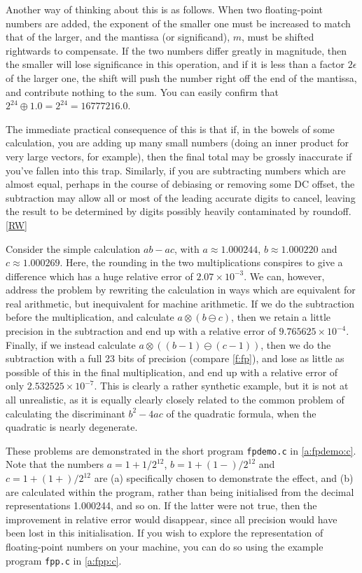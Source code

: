 \documentclass[11pt,oneside,chapters]{starlink}
\begin{document}
Another way of thinking about this is as follows.  When
two floating-point numbers are added, the exponent of
the smaller one must be increased to match that of the
larger, and the mantissa (or significand),
$m$, must be shifted rightwards
to compensate.  If the two numbers differ greatly in
magnitude, then the smaller will lose significance in
this operation, and if it is less than a factor
$2\epsilon$ of the larger one,
the shift will push the number right off the end of the
mantissa, and contribute nothing to the sum.  You can
easily confirm that $2^{24}\oplus1.0=2^{24}=16777216.0$.

The immediate practical consequence of this is that if,
in the bowels of some calculation, you are adding up
many small numbers (doing an inner product for very
large vectors, for example), then the final total may be
grossly inaccurate if you've fallen into this trap.
Similarly, if you are subtracting numbers which are
almost equal, perhaps in the course of debiasing or
removing some DC offset, the subtraction may allow all
or most of the leading accurate digits to cancel,
leaving the result to be determined by digits possibly
heavily contaminated by roundoff.  [\hyperlink{ta:rw}{RW}]

Consider the simple
calculation $ab-ac$, with
$a\approx1.000244$,
$b\approx1.000220$ and
$c\approx1.000269$.  Here, the
rounding in the two multiplications conspires to give a
difference which has a huge relative error of
$2.07\times10^{-3}$.  We can,
however, address the problem by rewriting the
calculation in ways which are equivalent for real
arithmetic, but inequivalent for machine arithmetic.  If
we do the subtraction before the multiplication, and
calculate $a\otimes(b\ominus c)$,
then we retain a little precision in the
subtraction and end up with a relative error of
$9.765625\times10^{-4}$.
Finally, if we instead calculate
$a\otimes((b-1)\ominus(c-1))$,
then we do the subtraction with a full 23 bits of
precision (compare \ref{f:fp}), and lose as little
as possible of this in the final multiplication, and end
up with a relative error of only
$2.532525\times10^{-7}$.  This
is clearly a rather synthetic example, but it is not at
all unrealistic, as it is equally clearly closely
related to the common problem of calculating the
discriminant $b^2-4ac$ of the
quadratic formula, when the quadratic is nearly
degenerate.

These problems are demonstrated in
the short program \texttt{fpdemo.c} in
\ref{a:fpdemo:c}.  Note that the numbers
$a=1+1/2^{12}$,
$b=1+(1-)/2^{12}$ and
$c=1+(1+)/2^{12}$ are (a)
specifically chosen to demonstrate the effect, and (b)
are calculated within the program, rather than being
initialised from the decimal representations 1.000244,
and so on.  If the latter were not true, then the
improvement in relative error would disappear, since all
precision would have been lost in this initialisation.
If you wish to explore the representation of
floating-point numbers on your machine, you can do so
using the example program \texttt{fpp.c} in
\ref{a:fpp:c}.
\end{document}
